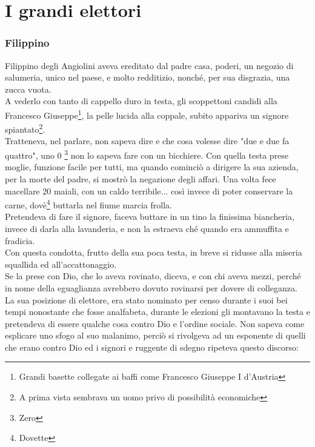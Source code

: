 \documentclass[10pt]{memoir} %
\begin{document}

\chapter{I grandi elettori}
\subsection{Filippino}
Filippino degli Angiolini aveva ereditato dal padre casa, poderi, un negozio di salumeria, unico nel paese, e molto redditizio, nonché, per sua disgrazia, una zucca vuota.\\
A vederlo con tanto di cappello duro in testa, gli scoppettoni candidi alla Francesco Giuseppe\footnote{Grandi basette collegate ai baffi come Francesco Giuseppe I d'Austria}, la pelle lucida alla coppale, subito appariva un signore spiantato\footnote{A prima vista sembrava un uomo privo di possibilità economiche}.\\
Tratteneva, nel parlare, non sapeva dire e che cosa volesse dire "due e due fa quattro", uno 0 \footnote{Zero} non lo sapeva fare con un bicchiere. Con quella testa prese moglie, funzione facile per tutti, ma quando cominciò a dirigere la sua azienda, per la morte del padre, si mostrò la negazione degli affari. Una volta fece macellare 20 maiali, con un caldo terribile... così invece di poter conservare la carne, dovè\footnote{Dovette} buttarla nel fiume marcia frolla. \\
Pretendeva di fare il signore, faceva buttare in un tino la finissima biancheria, invece di darla alla lavanderia, e non la estraeva ché quando era ammuffita e fradicia.\\
Con questa condotta, frutto della sua poca testa, in breve si ridusse alla miseria squallida ed all'accattonaggio.\\
Se la prese con Dio, che lo aveva rovinato, diceva, e con chi aveva mezzi, perché in nome della eguaglianza avrebbero dovuto rovinarsi per dovere di colleganza.\\
La sua posizione di elettore, era stato nominato per censo durante i suoi bei tempi nonostante che fosse analfabeta, durante le elezioni gli montavano la testa e pretendeva di essere qualche cosa contro Dio e l'ordine sociale. Non sapeva come esplicare uno sfogo al suo malanimo, perciò si rivolgeva ad un esponente di quelli che erano contro Dio ed i signori e ruggente di sdegno ripeteva questo discorso:
\end{document}
